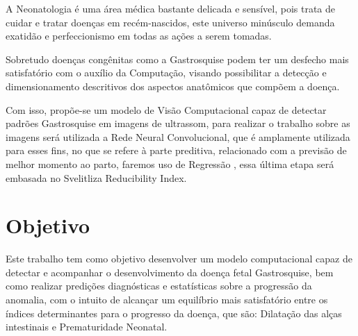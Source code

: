 A Neonatologia é uma área médica bastante delicada e sensível, pois trata de cuidar e tratar doenças em recém-nascidos, este universo minúsculo demanda exatidão e perfeccionismo em todas as ações a serem tomadas.

Sobretudo doenças congênitas como a Gastrosquise podem ter um desfecho mais satisfatório com o auxílio da Computação, visando possibilitar a detecção e dimensionamento descritivos dos aspectos anatômicos que compõem a doença.

Com isso,  propõe-se um modelo de Visão Computacional capaz de detectar padrões Gastrosquise em imagens de ultrassom, para realizar o trabalho sobre as imagens será utilizada a Rede Neural Convolucional, que é amplamente utilizada para  esses fins, no que se refere à parte preditiva, relacionado com a  previsão de melhor momento ao parto, faremos uso de Regressão , essa última etapa será embasada no Svelitliza Reducibility Index.


\section{Objetivo}


Este trabalho tem como objetivo desenvolver um modelo computacional capaz de detectar e acompanhar o desenvolvimento da doença fetal Gastrosquise, bem como realizar predições diagnósticas e estatísticas sobre a progressão da anomalia,  com o intuito de alcançar um equilíbrio mais satisfatório entre os índices determinantes para o progresso da doença, que são: Dilatação das alças intestinais e Prematuridade Neonatal.




